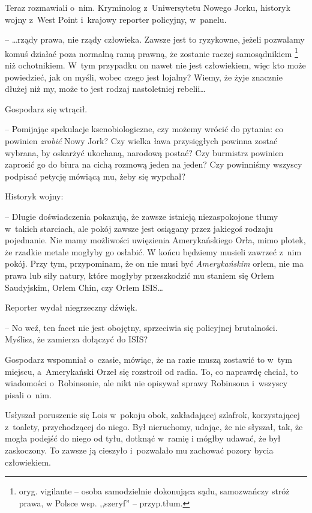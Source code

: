 \documentclass[oneside,polish,11pt,sfheadings]{mwbk}
\begin{document}
Teraz rozmawiali o~nim. Kryminolog z~Uniwersytetu Nowego Jorku, historyk
wojny z~West Point i~krajowy reporter policyjny, w~panelu.

-- \ldots  rządy prawa, nie rządy człowieka. Zawsze jest to ryzykowne, jeżeli
pozwalamy komuś działać poza normalną ramą prawną, że zostanie raczej
samosądnikiem \footnote{ oryg. vigilante -- osoba samodzielnie dokonująca sądu,
samozwańczy stróż prawa, w Polsce wsp. ,,szeryf'' -- przyp.tłum.} niż
ochotnikiem. W~tym przypadku on nawet nie jest człowiekiem, więc kto
może powiedzieć, jak on myśli, wobec czego jest lojalny? Wiemy, że żyje
znacznie dłużej niż my, może to jest rodzaj nastoletniej rebelii\ldots 

Gospodarz się wtrącił. 

-- Pomijając spekulacje ksenobiologiczne, czy
możemy wrócić do pytania: co powinien \textit{zrobić} Nowy Jork? Czy
wielka ława przysięgłych powinna zostać wybrana, by oskarżyć ukochaną,
narodową postać? Czy burmistrz powinien zaprosić go do biura na cichą
rozmową jeden na jeden? Czy powinniśmy wszyscy podpisać petycję mówiącą
mu, żeby się wypchał?

Historyk wojny: 

-- Długie doświadczenia pokazują, że zawsze istnieją
niezaspokojone tłumy w~takich starciach, ale pokój zawsze jest osiągany
przez jakiegoś rodzaju pojednanie. Nie mamy możliwości uwięzienia
Amerykańskiego Orła, mimo plotek, że rzadkie metale mogłyby go osłabić.
W końcu będziemy musieli zawrzeć z~nim pokój. Przy tym, przypominam, że
on nie musi być \textit{Amerykańskim} orłem, nie ma prawa lub siły natury,
które mogłyby przeszkodzić mu staniem się Orłem Saudyjskim, Orłem Chin,
czy Orłem ISIS\ldots 

Reporter wydał niegrzeczny dźwięk. 

-- No weź, ten facet nie jest
obojętny, sprzeciwia się policyjnej brutalności. Myślisz, że zamierza
dołączyć do ISIS?

Gospodarz wspomniał o~czasie, mówiąc, że na razie muszą zostawić to w~tym miejscu, a~Amerykański Orzeł się rozstroił od radia. To, co naprawdę
chciał, to wiadomości o~Robinsonie, ale nikt nie opisywał sprawy
Robinsona i~wszyscy pisali o~nim.

Usłyszał poruszenie się Lois w~pokoju obok, zakładającej szlafrok,
korzystającej z~toalety, przychodzącej do niego. Był nieruchomy, udając,
że nie słyszał, tak, że mogła podejść do niego od tyłu, dotknąć w~ramię
i mógłby udawać, że był zaskoczony. To zawsze ją cieszyło i~pozwalało mu
zachować pozory bycia człowiekiem.
\end{document}
